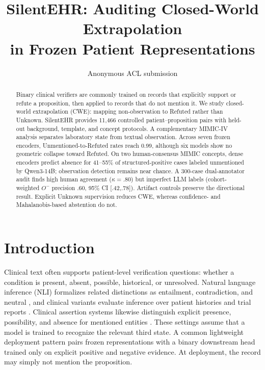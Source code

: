 \documentclass[11pt]{article}
\title{SilentEHR: Auditing Closed-World Extrapolation\\in Frozen Patient Representations}
\author{
  Anonymous ACL submission
}
\begin{document}
\maketitle


\begin{abstract}
Binary clinical verifiers are commonly trained on records that explicitly
support or refute a proposition, then applied to records that do not mention it.
We study closed-world extrapolation (CWE): mapping non-observation to Refuted
rather than Unknown. SilentEHR provides 11{,}466 controlled
patient--proposition pairs with held-out background, template, and concept
protocols. A complementary MIMIC-IV analysis separates laboratory state from
textual observation. Across seven frozen encoders, Unmentioned-to-Refuted rates
reach 0.99, although six models show no geometric collapse toward Refuted. On
two human-consensus MIMIC concepts, dense encoders predict absence for 41--55\%
of structured-positive cases labeled unmentioned by Qwen3-14B; observation
detection remains near chance. A 300-case dual-annotator audit finds high human
agreement ($\kappa=.80$) but imperfect LLM labels (cohort-weighted $O^-$ precision .60,
95\% CI [.42,.78]). Artifact controls preserve the directional result.
Explicit Unknown supervision reduces CWE, whereas confidence- and
Mahalanobis-based abstention do not.
\end{abstract}

\section{Introduction}
Clinical text often supports patient-level verification questions: whether a
condition is present, absent, possible, historical, or unresolved. Natural
language inference (NLI) formalizes related distinctions as entailment,
contradiction, and neutral \citep{bowman-etal-2015-large,williams-etal-2018-broad},
and clinical variants evaluate inference over patient histories and trial
reports \citep{romanov-shivade-2018-lessons,jullien-etal-2023-nli4ct}.
Clinical assertion systems likewise distinguish explicit presence, possibility,
and absence for mentioned entities \citep{van-aken-etal-2021-assertion}.
These settings assume that a model is trained to recognize the relevant
third state. A common lightweight deployment pattern pairs frozen representations
with a binary downstream head trained only on explicit positive and negative
evidence. At deployment, the record may simply not mention the proposition.
\end{document}
